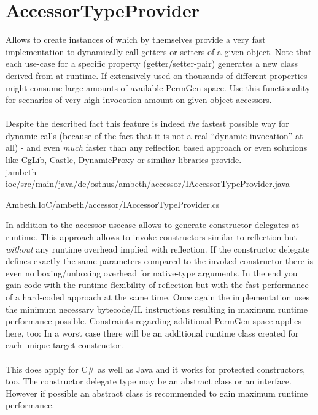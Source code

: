 \goodbreak
\section{AccessorTypeProvider}
\label{feature:AccessorTypeProvider}
Allows to create instances of  which by themselves provide a very fast implementation to dynamically call getters or setters of a given object. Note that each use-case for a specific property (getter/setter-pair) generates a new class derived from  at runtime. If extensively used on thousands of different properties might consume large amounts of available PermGen-space. Use this functionality for scenarios of very high invocation amount on given object accessors.\\\\
Despite the described fact this feature is indeed \emph{the} fastest possible way for dynamic calls (because of the fact that it is not a real ``dynamic invocation'' at all) - and even \emph{much} faster than any reflection based approach or even solutions like CgLib, Castle, DynamicProxy or similiar libraries provide.\\

{jambeth-ioc/src/main/java/de/osthus/ambeth/accessor/IAccessorTypeProvider.java}

{Ambeth.IoC/ambeth/accessor/IAccessorTypeProvider.cs}

In addition to the accessor-usecase  allows to generate constructor delegates at runtime. This approach allows to invoke constructors similar to reflection but \emph{without} any runtime overhead implied with reflection. If the constructor delegate defines exactly the same parameters compared to the invoked constructor there is even no boxing/unboxing overhead for native-type arguments. In the end you gain code with the runtime flexibility of reflection but with the fast performance of a hard-coded approach at the same time. Once again the implementation uses the minimum necessary bytecode/IL instructions resulting in maximum runtime performance possible. Constraints regarding additional PermGen-space applies here, too: In a worst case there will be an additional runtime class created for each unique target constructor.\\\\

This does apply for C\# as well as Java and it works for protected constructors, too. The constructor delegate type may be an abstract class or an interface. However if possible an abstract class is recommended to gain maximum runtime performance.

